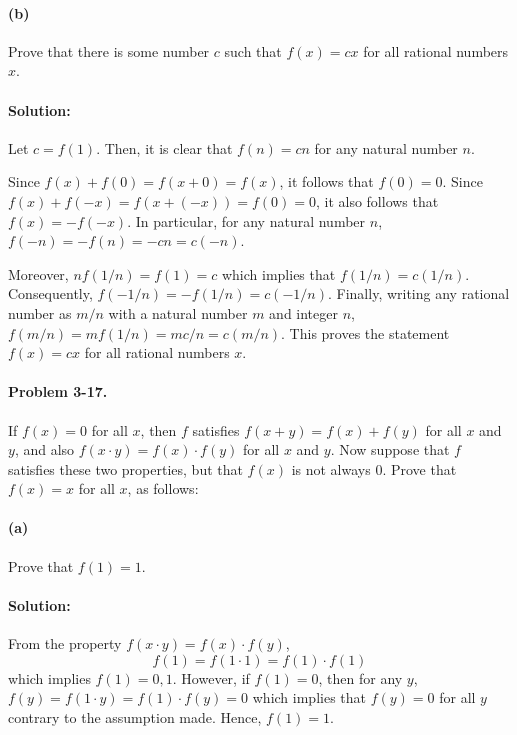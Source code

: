 \documentclass{article}
\begin{document}
\paragraph{(b)} Prove that there is some number $c$ such that $f(x) = cx$ for
all rational numbers $x$.

\paragraph{Solution:} Let $c = f(1)$. Then, it is clear that $f(n) = cn$ for
any natural number $n$.

Since $f(x) + f(0) = f(x + 0) = f(x)$, it follows that $f(0) = 0$. Since $f(x)
+ f(-x) = f(x + (-x)) = f(0) = 0$, it also follows that $f(x) = -f(-x)$. In
particular, for any natural number $n$, $f(-n) = -f(n) = -cn = c(-n)$.

Moreover, $nf(1/n) = f(1) = c$ which implies that $f(1/n) = c(1/n)$.
Consequently, $f(-1/n) = -f(1/n) = c(-1/n)$. Finally, writing any rational
number as $m/n$ with a natural number $m$ and integer $n$, $f(m/n) = mf(1/n) =
mc/n = c(m/n)$. This proves the statement $f(x) = cx$ for all rational numbers
$x$.

\paragraph{Problem 3-17.} If $f(x) = 0$ for all $x$, then $f$ satisfies $f(x +
y) = f(x) + f(y)$ for all $x$ and $y$, and also $f(x \cdot y) = f(x) \cdot
f(y)$ for all $x$ and $y$. Now suppose that $f$ satisfies these two properties,
but that $f(x)$ is not always 0. Prove that $f(x) = x$ for all $x$, as follows:

\paragraph{(a)} Prove that $f(1) = 1$.

\paragraph{Solution:} From the property $f(x \cdot y) = f(x) \cdot f(y)$,
\begin{equation*}
  f(1) = f(1 \cdot 1) = f(1) \cdot f(1)
\end{equation*} which implies $f(1) = 0, 1$. However, if $f(1) = 0$, then for
any $y$, $f(y) = f(1 \cdot y) = f(1) \cdot f(y) = 0$ which implies that $f(y) =
0$ for all $y$ contrary to the assumption made. Hence, $f(1) = 1$.
\end{document}

